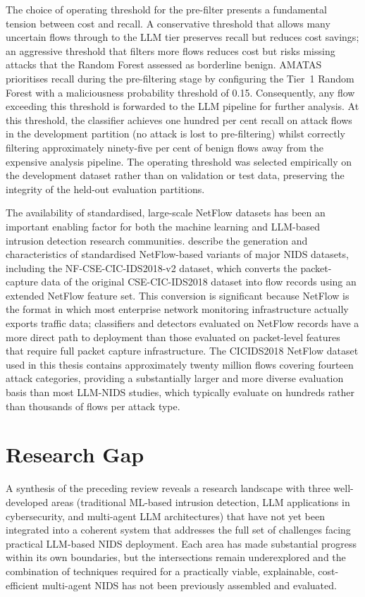 \documentclass[../main.tex]{subfiles}
\begin{document}
The choice of operating threshold for the pre-filter presents a fundamental tension between cost and recall. A conservative threshold that allows many uncertain flows through to the LLM tier preserves recall but reduces cost savings; an aggressive threshold that filters more flows reduces cost but risks missing attacks that the Random Forest assessed as borderline benign. AMATAS prioritises recall during the pre-filtering stage by configuring the Tier~1 Random Forest with a maliciousness probability threshold of 0.15. Consequently, any flow exceeding this threshold is forwarded to the LLM pipeline for further analysis. At this threshold, the classifier achieves one hundred per cent recall on attack flows in the development partition (no attack is lost to pre-filtering) whilst correctly filtering approximately ninety-five per cent of benign flows away from the expensive analysis pipeline. The operating threshold was selected empirically on the development dataset rather than on validation or test data, preserving the integrity of the held-out evaluation partitions.

The availability of standardised, large-scale NetFlow datasets has been an important enabling factor for both the machine learning and LLM-based intrusion detection research communities. \textcite{Sarhan2021} describe the generation and characteristics of standardised NetFlow-based variants of major NIDS datasets, including the NF-CSE-CIC-IDS2018-v2 dataset, which converts the packet-capture data of the original CSE-CIC-IDS2018 dataset into flow records using an extended NetFlow feature set. This conversion is significant because NetFlow is the format in which most enterprise network monitoring infrastructure actually exports traffic data; classifiers and detectors evaluated on NetFlow records have a more direct path to deployment than those evaluated on packet-level features that require full packet capture infrastructure. The CICIDS2018 NetFlow dataset used in this thesis contains approximately twenty million flows covering fourteen attack categories, providing a substantially larger and more diverse evaluation basis than most LLM-NIDS studies, which typically evaluate on hundreds rather than thousands of flows per attack type.

\section{Research Gap}
\label{sec:research-gap}

A synthesis of the preceding review reveals a research landscape with three well-developed areas (traditional ML-based intrusion detection, LLM applications in cybersecurity, and multi-agent LLM architectures) that have not yet been integrated into a coherent system that addresses the full set of challenges facing practical LLM-based NIDS deployment. Each area has made substantial progress within its own boundaries, but the intersections remain underexplored and the combination of techniques required for a practically viable, explainable, cost-efficient multi-agent NIDS has not been previously assembled and evaluated.
\end{document}
